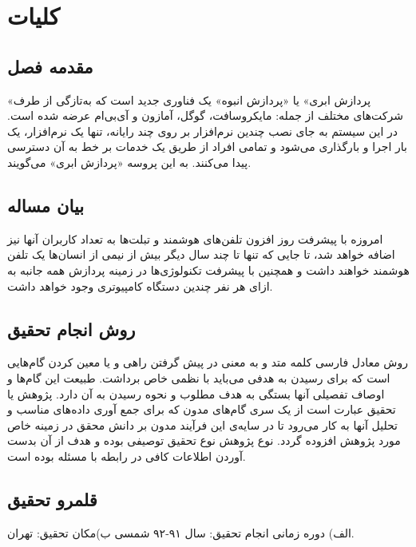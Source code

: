 \chapter{کلیات}
\section{مقدمه فصل}
«پردازش ابری» یا «پردازش انبوه» یک فناوری جدید است که به‌تازگی از طرف شرکت‌های مختلف از جمله: مایکروسافت، گوگل، آمازون و آی‌بی‌ام عرضه شده است. در این سیستم به جای نصب چندین نرم‌افزار بر روی چند رایانه، تنها یک نرم‌افزار، یک بار اجرا و بارگذاری می‌شود و تمامی افراد از طریق یک خدمات بر خط 
به آن دسترسی پیدا می‌کنند. به این پروسه «پردازش ابری» 
می‌گویند.
\section{بیان مساله}
امروزه با پیشرفت روز افزون تلفن‌های هوشمند و تبلت‌ها به تعداد کاربران آنها نیز اضافه خواهد شد، تا جایی که تنها تا چند سال دیگر بیش از نیمی از انسان‌ها یک تلفن هوشمند خواهند داشت و همچنین با پیشرفت تکنولوژی‌ها در زمینه پردازش همه جانبه 
به ازای هر نفر چندین دستگاه کامپیوتری وجود خواهد داشت.

\section{روش انجام تحقیق}
روش معادل فارسی کلمه متد 
و به معنی در پیش گرفتن راهی و یا معین کردن گام‌هایی است که برای رسیدن به هدفی می‌باید با نظمی خاص برداشت. طبیعت این گام‌ها و اوصاف تفصیلی آنها بستگی به هدف مطلوب و نحوه رسیدن به آن دارد.
پژوهش یا تحقیق عبارت است از یک سری گام‌های مدون که برای جمع آوری داده‌های مناسب  و تحلیل آنها به کار می‌رود تا در سایه‌ی این فرآیند مدون بر دانش محقق در زمینه خاص مورد پژوهش افزوده گردد. نوع پژوهش نوع تحقیق توصیفی بوده و هدف از آن بدست آوردن اطلاعات کافی در رابطه با مسئله بوده است.
\section{قلمرو تحقیق}
الف) دوره زمانی انجام تحقیق:
سال ۹۱-۹۲ شمسی
ب)مکان تحقیق:
تهران.
